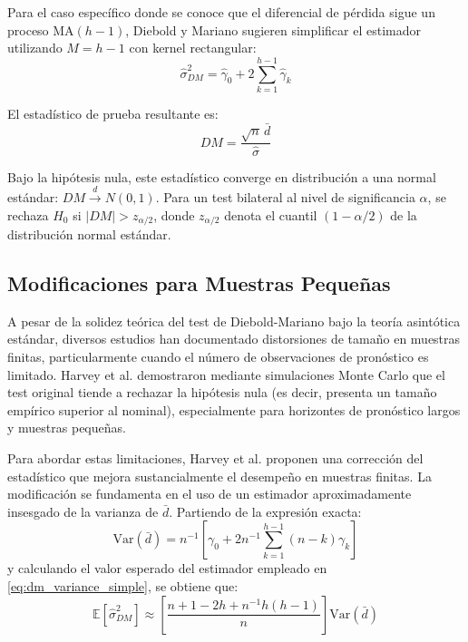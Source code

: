 Para el caso específico donde se conoce que el diferencial de pérdida sigue un proceso MA$(h-1)$, Diebold y Mariano sugieren simplificar el estimador utilizando $M = h-1$ con kernel rectangular:
\begin{equation}
\hat{\sigma}^2_{DM} = \hat{\gamma}_0 + 2\sum_{k=1}^{h-1} \hat{\gamma}_k
\label{eq:dm_variance_simple}
\end{equation}

El estadístico de prueba resultante es:
\begin{equation}
DM = \frac{\sqrt{n}\,\bar{d}}{\hat{\sigma}}
\label{eq:dm_statistic}
\end{equation}

Bajo la hipótesis nula, este estadístico converge en distribución a una normal estándar: $DM \xrightarrow{d} N(0,1)$. Para un test bilateral al nivel de significancia $\alpha$, se rechaza $H_0$ si $|DM| > z_{\alpha/2}$, donde $z_{\alpha/2}$ denota el cuantil $(1-\alpha/2)$ de la distribución normal estándar.

\subsection{Modificaciones para Muestras Pequeñas}

A pesar de la solidez teórica del test de Diebold-Mariano bajo la teoría asintótica estándar, diversos estudios han documentado distorsiones de tamaño en muestras finitas, particularmente cuando el número de observaciones de pronóstico es limitado. Harvey et al. \parencite{Harvey1997} demostraron mediante simulaciones Monte Carlo que el test original tiende a rechazar la hipótesis nula (es decir, presenta un tamaño empírico superior al nominal), especialmente para horizontes de pronóstico largos y muestras pequeñas.

Para abordar estas limitaciones, Harvey et al. proponen una corrección del estadístico que mejora sustancialmente el desempeño en muestras finitas. La modificación se fundamenta en el uso de un estimador aproximadamente insesgado de la varianza de $\bar{d}$. Partiendo de la expresión exacta:
\begin{equation}
\text{Var}(\bar{d}) = n^{-1}\left[\gamma_0 + 2n^{-1}\sum_{k=1}^{h-1}(n-k)\gamma_k\right]
\end{equation}
y calculando el valor esperado del estimador empleado en \eqref{eq:dm_variance_simple}, se obtiene que:
\begin{equation}
\mathbb{E}[\hat{\sigma}^2_{DM}] \approx \left[\frac{n+1-2h+n^{-1}h(h-1)}{n}\right]\text{Var}(\bar{d})
\end{equation}

